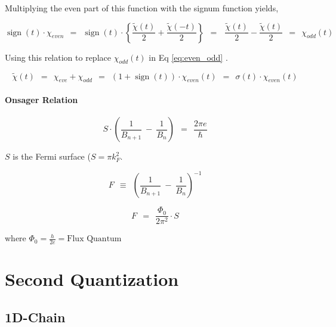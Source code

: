 \documentclass[10pt]{report}
\numberwithin{equation}{chapter}
\newcommand{\refEq}[1]{
  Eq  \ref{#1}
}
\DeclareMathOperator{\sign}{sign}
\begin{document}
Multiplying the even part of this function with the signum function yields,

\begin{equation}
  \sign(t) \cdot \chi_{even} ~~ = ~~ \sign(t) \cdot \left\{ \frac{\tilde{\chi}(t)}{2} + \frac{\tilde{\chi}(-t)}{2} \right\} ~~ = ~~~\frac{\tilde{\chi}(t)}{2} - \frac{\tilde{\chi}(t)}{2} ~~ = ~~ \chi_{odd}(t)
\end{equation}


Using this relation to replace $\chi_{odd}(t)$ in \refEq{eq:even_odd}.


\begin{equation}
\tilde{\chi}(t) ~~ = ~~ \chi_{eve} + \chi_{odd} ~~ = ~~ (1 + \sign(t)) \cdot \chi_{even}(t) ~~ = ~~ \sigma(t) \cdot \chi_{even}(t)
\end{equation}

% 

\subsubsection{Onsager Relation}

\begin{equation}
  S \cdot \left( \frac{1}{B_{n+1}} ~-~ \frac{1}{B_n} \right) ~~=~~ \frac{2 \pi e}{\hbar}
\end{equation}

$S$ is the Fermi surface ($S=\pi k_F^2$.

\begin{equation}
  F ~~\equiv~~ \left( \frac{1}{B_{n+1}} ~-~ \frac{1}{B_n} \right)^{-1}
\end{equation}

\begin{equation}
  F ~~=~~ \frac{\Phi_0}{2 \pi^2} \cdot S
\end{equation}

where $\Phi_0 = \frac{h}{2e} = \text{Flux Quantum}$

%

\chapter{Second Quantization}

\section{1D-Chain}
\end{document}
